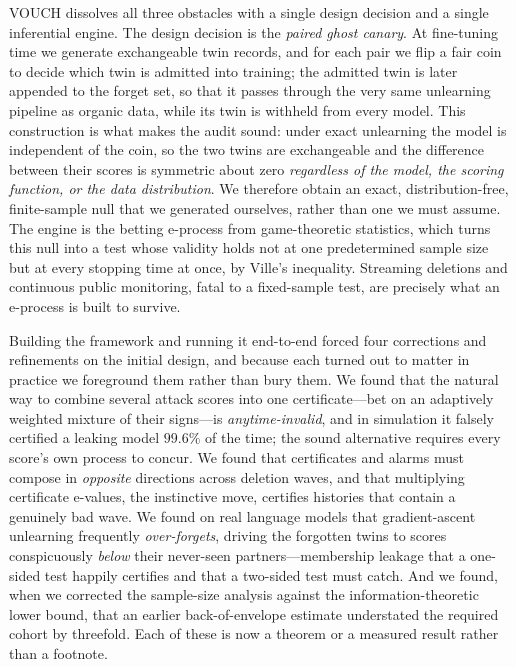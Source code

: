 \documentclass[pdflatex,sn-mathphys-num]{sn-jnl}
\theoremstyle{thmstyleone}
\theoremstyle{thmstyletwo}
\theoremstyle{thmstylethree}
\begin{document}
VOUCH dissolves all three obstacles with a single design decision and a single
inferential engine. The design decision is the \emph{paired ghost canary}. At
fine-tuning time we generate exchangeable twin records, and for each pair we flip a
fair coin to decide which twin is admitted into training; the admitted twin is later
appended to the forget set, so that it passes through the very same unlearning pipeline
as organic data, while its twin is withheld from every model. This construction is what
makes the audit sound: under exact unlearning the model is independent of the coin, so
the two twins are exchangeable and the difference between their scores is symmetric
about zero \emph{regardless of the model, the scoring function, or the data
distribution}. We therefore obtain an exact, distribution-free, finite-sample null that
we generated ourselves, rather than one we must assume. The engine is the betting
e-process from game-theoretic statistics, which turns this null into a test whose
validity holds not at one predetermined sample size but at every stopping time at once,
by Ville's inequality. Streaming deletions and continuous public monitoring, fatal to a
fixed-sample test, are precisely what an e-process is built to survive.

Building the framework and running it end-to-end forced four corrections and
refinements on the initial design, and because each turned out to matter in practice we
foreground them rather than bury them. We found that the natural way to combine several
attack scores into one certificate---bet on an adaptively weighted mixture of their
signs---is \emph{anytime-invalid}, and in simulation it falsely certified a leaking
model $99.6\%$ of the time; the sound alternative requires every score's own process to
concur. We found that certificates and alarms must compose in \emph{opposite}
directions across deletion waves, and that multiplying certificate e-values, the
instinctive move, certifies histories that contain a genuinely bad wave. We found on
real language models that gradient-ascent unlearning frequently \emph{over-forgets},
driving the forgotten twins to scores conspicuously \emph{below} their never-seen
partners---membership leakage that a one-sided test happily certifies and that a
two-sided test must catch. And we found, when we corrected the sample-size analysis
against the information-theoretic lower bound, that an earlier back-of-envelope estimate
understated the required cohort by threefold. Each of these is now a theorem or a
measured result rather than a footnote.
\end{document}
